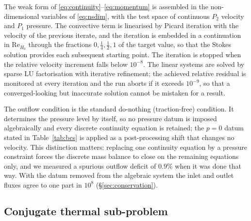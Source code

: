 \documentclass[11pt,a4paper]{article}
\newcommand{\ReH}{\mathrm{Re}_{H_0}}
\begin{document}
The weak form of \eqref{eq:continuity}--\eqref{eq:momentum} is assembled in
the non-dimensional variables of \eqref{eq:nsdim}, with the test space of
continuous $P_2$ velocity and $P_1$ pressure. The convective term is
linearised by Picard iteration with the velocity of the previous iterate, and
the iteration is embedded in a continuation in $\ReH$ through the fractions
$0,\tfrac14,\tfrac12,1$ of the target value, so that the Stokes solution
provides each subsequent starting point. The iteration is stopped when the
relative velocity increment falls below $10^{-8}$. The linear systems are
solved by sparse LU factorisation with iterative refinement; the achieved
relative residual is monitored at every iteration and the run aborts if it
exceeds $10^{-9}$, so that a converged-looking but inaccurate solution cannot
be mistaken for a result.

The outflow condition is the standard do-nothing (traction-free) condition. It
determines the pressure level by itself, so no pressure datum is imposed
algebraically and every discrete continuity equation is retained; the $p=0$
datum stated in Table~\ref{tab:bcs} is applied as a post-processing shift that
changes no velocity. This distinction matters: replacing one continuity
equation by a pressure constraint forces the discrete mass balance to close on
the remaining equations only, and we measured a spurious outflow deficit of
$0.9\%$ when it was done that way. With the datum removed from the algebraic
system the inlet and outlet fluxes agree to one part in $10^{8}$
(\S\ref{sec:conservation}).

\subsection{Conjugate thermal sub-problem}
\label{sec:thermalassembler}
\end{document}
